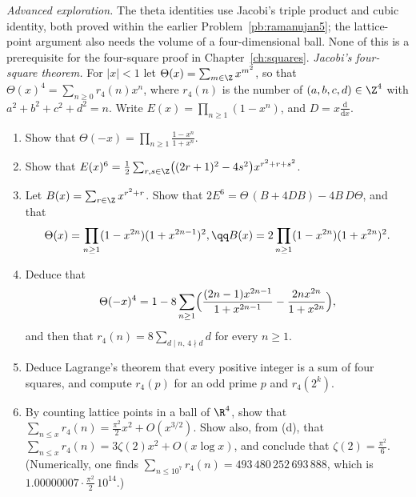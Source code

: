 \begin{exercise}[Journey]\label{pb:jacobi}
\emph{Advanced exploration.} The theta identities use Jacobi's
triple product and cubic identity, both proved within the earlier
Problem~\ref{pb:ramanujan5}; the lattice-point argument
also needs the volume of a four-dimensional ball.
None of this is a prerequisite for the four-square proof in Chapter~\ref{ch:squares}.
\emph{Jacobi's four-square theorem.} For $|x|<1$ let $\Theta(x)=\sum_{m\in\Z}x^{m^2}$, so that $\Theta(x)^4=\sum_{n\ge0}r_4(n)x^n$, where $r_4(n)$ is the number of
$(a,b,c,d)\in\Z^4$ with $a^2+b^2+c^2+d^2=n$. Write $E(x)=\prod_{n\ge1}(1-x^n)$, and $D=x\frac{\mathrm d}{\mathrm dx}$.
\begin{enumerate}[label=(\alph*)]
\item Show that $\Theta(-x)=\prod_{n\ge1}\frac{1-x^n}{1+x^n}$.
\item Show that $E(x)^6=\frac12\sum_{r,s\in\Z}\bigl((2r+1)^2-4s^2\bigr)x^{r^2+r+s^2}$.
\item Let $B(x)=\sum_{r\in\Z}x^{r^2+r}$. Show that $2E^6=\Theta\,(B+4DB)-4B\,D\Theta$, and that
\[
\Theta(x)=\prod_{n\ge1}(1-x^{2n})(1+x^{2n-1})^2,\qq B(x)=2\prod_{n\ge1}(1-x^{2n})(1+x^{2n})^2.
\]
\item Deduce that
\[
\Theta(-x)^4=1-8\sum_{n\ge1}\Bigl(\frac{(2n-1)x^{2n-1}}{1+x^{2n-1}}-\frac{2nx^{2n}}{1+x^{2n}}\Bigr),
\]
and then that $r_4(n)=8\sum_{d\mid n,\,4\nmid d}d$ for every $n\ge1$.
\item Deduce Lagrange's theorem that every positive integer is a sum of four squares, and compute $r_4(p)$ for an odd prime $p$ and $r_4(2^k)$.
\item By counting lattice points in a ball of $\R^4$, show that $\sum_{n\le x}r_4(n)=\frac{\pi^2}2x^2+O(x^{3/2})$. Show also, from (d), that
$\sum_{n\le x}r_4(n)=3\zeta(2)x^2+O(x\log x)$, and conclude that $\zeta(2)=\frac{\pi^2}6$. (Numerically, one finds $\sum_{n\le10^7}r_4(n)=493\,480\,252\,693\,888$, which is
$1.00000007\cdot\frac{\pi^2}2\,10^{14}$.)
\end{enumerate}
\end{exercise}

